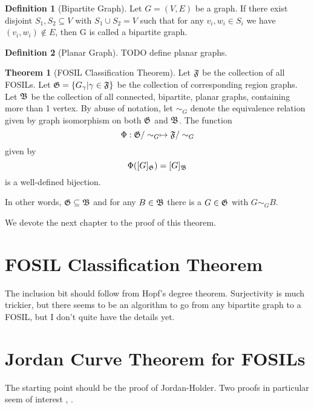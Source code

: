 \documentclass{article}
\theoremstyle{definition}
\newtheorem{definition}{Definition}
\theoremstyle{proposition}
\theoremstyle{theorem}
\newtheorem{theorem}{Theorem}
\begin{document}
\begin{definition}[Bipartite Graph]
Let $G=(V,E)$ be a graph. If there exist disjoint $S_{1}, S_{2} \subseteq V$ with $S_{1} \cup S_{2} = V$ such that for any $v_{i}, w_{i} \in S_{i}$ we have $(v_{i}, w_{i}) \notin E$, then G is called a bipartite graph.
\end{definition}

\begin{definition}[Planar Graph]
TODO define planar graphs.
\end{definition}

\begin{theorem}[FOSIL Classification Theorem]

Let $\frak{F}$ be the collection of all FOSILs. Let $\frak{G}=\{G_{\gamma} | \gamma \in \frak{F}\}$ be the collection of corresponding region graphs. Let $\frak{B}$ be the collection of all connected, bipartite, planar graphs, containing more than 1 vertex. By abuse of notation, let $\sim_{G}$ denote the equivalence relation given by graph isomorphism on both $\frak{G}$ and $\frak{B}$. The function $$\Phi : \frak{G}/\sim_{G} \mapsto \frak{F}/\sim_{G}$$ given by $$\Phi([G]_{\frak{G}}) = [G]_{\frak{B}}$$ is a well-defined bijection.

In other words, $\frak{G} \subseteq \frak{B}$ and for any $B \in \frak{B}$ there is a $G \in \frak{G}$ with $G \sim_{G} B$.
\end{theorem}
We devote the next chapter to the proof of this theorem.

\section{FOSIL Classification Theorem}

The inclusion bit should follow from Hopf's degree theorem. Surjectivity is much trickier, but there seems to be an algorithm to go from any bipartite graph to a FOSIL, but I don't quite have the details yet.

\section{Jordan Curve Theorem for FOSILs}

The starting point should be the proof of Jordan-Holder. Two proofs in particular seem of interest \cite{hales07}, \cite{thomassen92}.



\end{document}
